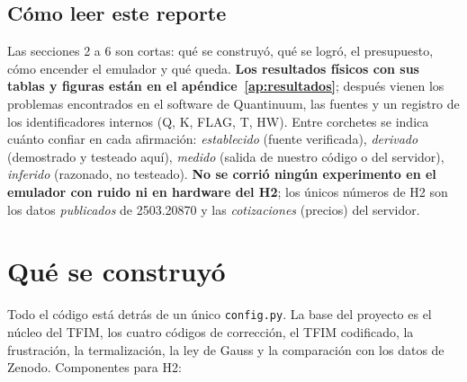 \documentclass[11pt,a4paper]{article}
\begin{document}
\subsection{C\'omo leer este reporte}
Las secciones 2 a 6 son cortas: qu\'e se construy\'o, qu\'e se logr\'o, el presupuesto, c\'omo encender el
emulador y qu\'e queda. \textbf{Los resultados f\'isicos con sus tablas y figuras est\'an en el
ap\'endice~\ref{ap:resultados}}; despu\'es vienen los problemas encontrados en el software de Quantinuum,
las fuentes y un registro de los identificadores internos (Q, K, FLAG, T, HW). Entre corchetes se
indica cu\'anto confiar en cada afirmaci\'on: \emph{establecido} (fuente verificada), \emph{derivado}
(demostrado y testeado aqu\'i), \emph{medido} (salida de nuestro c\'odigo o del servidor),
\emph{inferido} (razonado, no testeado). \textbf{No se corri\'o ning\'un experimento en el emulador con
ruido ni en hardware del H2}; los \'unicos n\'umeros de H2 son los datos \emph{publicados} de 2503.20870
y las \emph{cotizaciones} (precios) del servidor.

\section{Qu\'e se construy\'o}

Todo el c\'odigo est\'a detr\'as de un \'unico \texttt{config.py}. La base del proyecto es el n\'ucleo del TFIM,
los cuatro c\'odigos de correcci\'on, el TFIM codificado, la frustraci\'on, la termalizaci\'on, la ley de Gauss y la
comparaci\'on con los datos de Zenodo. Componentes para H2:
\end{document}

